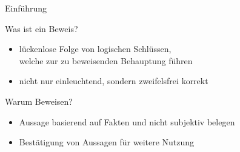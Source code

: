 %
%
%
%

\begin{frame}{Einführung}
\begin{alertblock}{Was ist ein Beweis?}
\begin{itemize}
        \item lückenlose Folge von logischen Schlüssen,\\welche zur zu beweisenden Behauptung führen
        \item nicht nur einleuchtend, sondern zweifelsfrei korrekt
    \end{itemize}
\end{alertblock}
\begin{alertblock}{Warum Beweisen?}
    \begin{itemize}
            \item Aussage basierend auf Fakten und nicht subjektiv belegen
            \item Bestätigung von Aussagen für weitere Nutzung
        \end{itemize}
    \end{alertblock}
\end{frame}

